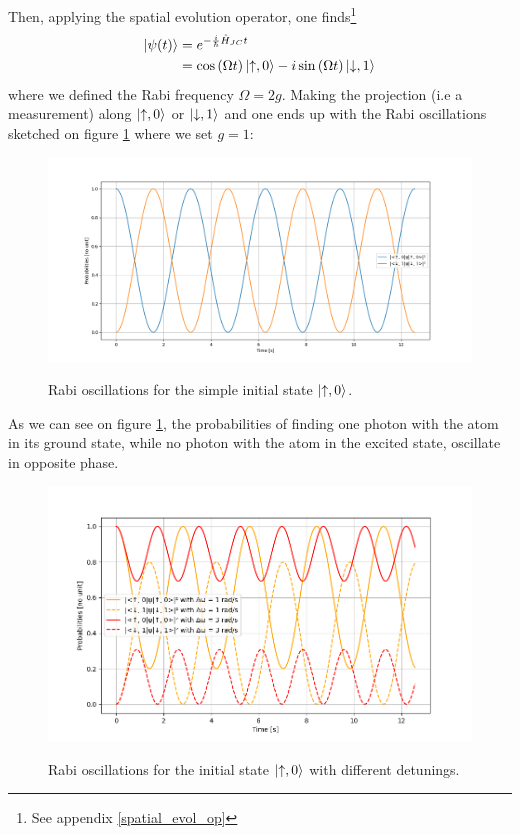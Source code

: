 \documentclass[10pt]{report}
\DeclarePairedDelimiter\ket{\lvert}{\rangle}
\begin{document}
Then, applying the spatial evolution operator, one finds\footnote{See appendix \ref{spatial_evol_op}}
\begin{align}
\ket{\psi(t)} &= e^{-\frac{i}{\hbar}\hat{H}_{JC}t}\\
&= \cos\left(\Omega t\right) \ket{\uparrow, 0} - i \sin\left(\Omega t\right) \ket{\downarrow, 1}
\end{align}
where we defined the Rabi frequency $\Omega = 2g$. Making the projection (i.e a measurement) along $\ket{\uparrow, 0}$ or $\ket{\downarrow, 1}$ and one ends up with the Rabi oscillations sketched on figure  \ref{fig:rabi-no-delta} where we set $g=1$:

\begin{figure}[h]
\caption{Rabi oscillations for the simple initial state $\ket{\uparrow, 0}$.}
\centering
\includegraphics[width=\textwidth]{rabi-no-delta}
\label{fig:rabi-no-delta}
\end{figure}

As we can see on figure \ref{fig:rabi-no-delta}, the probabilities of finding one photon with the atom in its ground state, while no photon with the atom in the excited state, oscillate in opposite phase.

\begin{figure}[h!]
\caption{Rabi oscillations for the initial state $\ket{\uparrow, 0}$ with different detunings.}
\centering
\includegraphics[width=\textwidth]{rabi-prog-delta}
\label{fig:rabi-prog-delta}
\end{figure}
\end{document}
